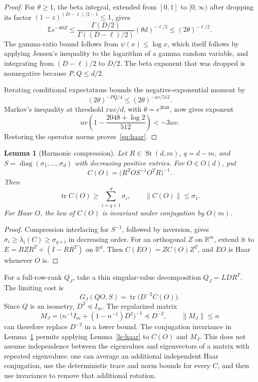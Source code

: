 \documentclass[11pt]{article}
\newtheorem{lemma}[theorem]{Lemma}
\theoremstyle{remark}\newtheorem{remark}[theorem]{Remark}
\newcommand{\R}{\mathbb R}
\newcommand{\E}{\mathbb E}
\newcommand{\tr}{\operatorname{tr}}
\newcommand{\diag}{\operatorname{diag}}
\newcommand{\St}{\operatorname{St}}
\newcommand{\eps}{\varepsilon}
\begin{document}
\begin{proof}
For $\theta\ge1$, the beta integral, extended from $[0,1]$ to $[0,\infty)$ after dropping its factor $(1-z)^{(D-\ell)/2-1}\le1$, gives
\[
 \E e^{-\theta dZ}\le
 \frac{\Gamma(D/2)}{\Gamma((D-\ell)/2)}(\theta d)^{-\ell/2}
 \le(2\theta)^{-\ell/2}.
\]
The gamma-ratio bound follows from $\psi(x)\le\log x$, which itself follows by applying Jensen's inequality to the logarithm of a gamma random variable, and integrating from $(D-\ell)/2$ to $D/2$. The beta exponent that was dropped is nonnegative because $P,Q\le d/2$.

Iterating conditional expectations bounds the negative-exponential moment by
\[
 (2\theta)^{-PQ/4}\le(2\theta)^{-uv/512}.
\]
Markov's inequality at threshold $\eps uv/d$, with $\theta=e^{2048}$, now gives exponent
\[
 uv\left(1-\frac{2048+\log2}{512}\right)<-3uv.
\]
Restoring the operator norms proves~\eqref{eq:haar}.
\end{proof}

\begin{lemma}[Harmonic compression]\label{le:compression}
Let $R\in\St(d,m)$, $q=d-m$, and $S=\diag(\sigma_1,\ldots,\sigma_d)$ with decreasing positive entries. For $O\in O(d)$, put
\[
 C(O)=\bigl(R^T O S^{-1}O^T R\bigr)^{-1}.
\]
Then
\[
 \tr C(O)\ge\sum_{i=q+1}^d\sigma_i,\qquad
 \|C(O)\|\le\sigma_1.
\]
For Haar $O$, the law of $C(O)$ is invariant under conjugation by $O(m)$.
\end{lemma}
\begin{proof}
Compression interlacing for $S^{-1}$, followed by inversion, gives
$\sigma_i\ge\lambda_i(C)\ge\sigma_{q+i}$ in decreasing order. For an orthogonal $Z$ on $\R^m$, extend it to $E=RZR^T+(I-RR^T)$ on $\R^d$. Then $C(EO)=ZC(O)Z^T$, and $EO$ is Haar whenever $O$ is.
\end{proof}

For a full-row-rank $Q_J$, take a thin singular-value decomposition $Q_J=L D R^T$. The limiting cost is
\begin{equation}\label{eq:weightedcost}
 G_J(QO,S)=\tr\bigl(D^{-2}C(O)\bigr).
\end{equation}
Since $Q$ is an isometry, $D^2\preceq I_m$. The regularized matrix
\begin{equation}\label{eq:Mj}
 M_J=\bigl(n^{-1}I_m+(1-n^{-1})D^2\bigr)^{-1}
 \preceq D^{-2},\qquad \|M_J\|\le n
\end{equation}
can therefore replace $D^{-2}$ in a lower bound. The conjugation invariance in Lemma~\ref{le:compression} permits applying Lemma~\ref{le:haar} to $C(O)$ and $M_J$. This does not assume independence between the eigenvalues and eigenvectors of a matrix with repeated eigenvalues: one can average an additional independent Haar conjugation, use the deterministic trace and norm bounds for every $C$, and then use invariance to remove that additional rotation.
\end{document}
